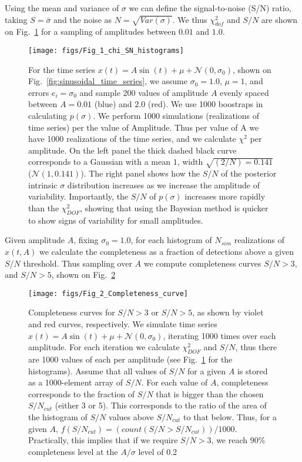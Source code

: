 \documentclass[fleqn,usenatbib]{mnras}  %
\begin{document}
Using the mean and variance of $\sigma$ we can define the signal-to-noise (S/N) ratio, taking  $S= \bar{\sigma}$ and the noise as $N = \sqrt{Var(\sigma)}$. We thus $\chi^{2}_{dof}$ and $S/N$ are shown on Fig.~\ref{fig:chi2_and_SN} for a sampling of amplitudes between $0.01$ and $1.0$.  

\begin{figure}
 \texttt{[image: figs/Fig\_1\_chi\_SN\_histograms]}
 \caption{For the time series $x(t) = A \sin{(t)}+\mu+\mathcal{N}(0,\sigma_{0})$, shown on Fig.~\ref{fig:sinusoidal_time_series}, we assume $\sigma_{0}=1.0$, $\mu=1$, and errors $e_{i} = \sigma_{0}$ and sample 200 values of amplitude $A$ evenly spaced between $A=0.01$ (blue) and $2.0$ (red). We use 1000 boostraps in calculating $p(\sigma)$. We perform  1000 simulations (realizations of time series) per the value of Amplitude. Thus per value of A we have 1000 realizations of the time series, and we calculate $\chi^{2}$ per amplitude.  On the left panel the thick dashed black curve corresponds to a Gaussian  with a mean $1$, width $\sqrt{(2/N) = 0.141}$  ($\mathcal{N}(1,0.141)$). The right panel shows how the $S/N$ of the posterior intrinsic $\sigma$ distribution increases as we increase the amplitude of variability. Importantly, the  $S/N$ of $p(\sigma)$ increases more rapidly than the $\chi^{2}_{DOF}$, showing that using the Bayesian method is quicker to show signs of variability for small amplitudes.}
 \label{fig:chi2_and_SN}
\end{figure}

Given amplitude $A$, fixing $\sigma_{0} =1.0$,  for each histogram of $N_{sim}$ realizations of $x(t,A)$   we calculate the completeness as a  fraction of detections above a given $S/N$ threshold. Thus sampling over $A$ we compute completeness curves $S/N > 3$, and $S/N > 5$, shown on Fig.~\ref{fig:completeness_curve}


\begin{figure}
  \texttt{[image: figs/Fig\_2\_Completeness\_curve]}
  \caption{Completeness curves for $S/N > 3$ or $S/N > 5$, as shown by violet and red curves, respectively. We simulate time series $x(t) = A \sin{(t)}+\mu+\mathcal{N}(0,\sigma_{0})$, iterating 1000 times over each amplitude. For each iteration we calculate $\chi^{2}_{DOF}$ and $S/N$, thus there are 1000 values of each per amplitude (see Fig.~\ref{fig:chi2_and_SN}  for the histograms).  Assume that all values of $S/N$ for a given $A$ is stored as a 1000-element array of $S/N$. For each value of $A$, completeness corresponds to the fraction of $S/N$ that is bigger than the chosen  $S/N_{cut}$ (either 3 or 5). This corresponds to the ratio of the area of the histogram of $S/N$ values  above  $S/N_{cut}$  to that below. Thus, for a given $A$,  $f(S/N_{cut}) = (count(S/N > S/N_{cut})) / 1000$. Practically, this implies that if we require $S/N > 3$, we reach $90\%$ completeness level at the $A/\sigma$ level of 0.2}
  \label{fig:completeness_curve}
\end{figure}
\end{document}
